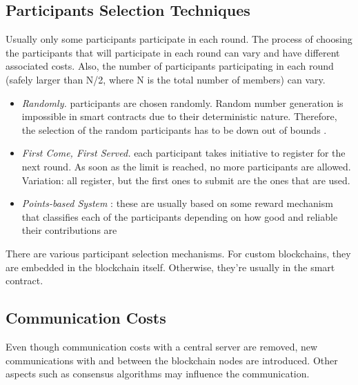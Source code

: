 \subsection{Participants Selection Techniques}


Usually only some participants participate in each round. The process of choosing the participants that will participate in each round can vary and have different associated costs. Also, the number of participants participating in each round (safely larger than N/2, where N is the total number of members) can vary.

\begin{itemize}
    \item \textit{Randomly.} participants are chosen randomly. Random number generation is impossible in smart contracts due to their deterministic nature. Therefore, the selection of the random participants has to be down out of bounds \cite{9293091}.
    
    \item \textit{First Come, First Served.} each participant takes initiative to register for the next round. As soon as the limit is reached, no more participants are allowed. \cite{9184854}  Variation: all register, but the first ones to submit are the ones that are used. \cite{needed}
    
    \item \textit{Points-based System} : these are usually based on some reward mechanism that classifies each of the participants depending on how good and reliable their contributions are \cite{9293091, baffle, demo, 8905038, 8893114, Peyvandi2022}
\end{itemize}

There are various participant selection mechanisms. For custom blockchains, they are embedded in the blockchain itself. Otherwise, they're usually in the smart contract.

\subsection{Communication Costs}


Even though communication costs with a central server are removed, new communications with and between the blockchain nodes are introduced. Other aspects such as consensus algorithms may influence the communication.

